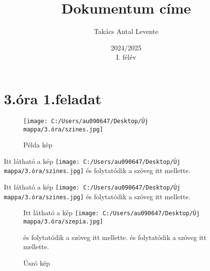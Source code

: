 \documentclass[12]{article}
\begin{document}
\listoffigures
{}

\listoftables

\title{Dokumentum címe} %
\author{Takács Antal Levente}
\date{2024/2025\\I. félév}

\maketitle





\newpage

\section{3.óra 1.feladat}

\begin{figure}[h]
    \centering
    \texttt{[image: C:/Users/au090647/Desktop/Új mappa/3.óra/szines.jpg]}
    \caption{Példa kép}
\end{figure}


\lipsum[1]


Itt látható a kép \texttt{[image: C:/Users/au090647/Desktop/Új mappa/3.óra/szines.jpg]} és folytatódik a szöveg itt mellette. \lipsum[2]


\lipsum[3]
\newpage

\lipsum[1]


Itt látható a kép \texttt{[image: C:/Users/au090647/Desktop/Új mappa/3.óra/szines.jpg]} és folytatódik a szöveg itt mellette. \lipsum[2]


\lipsum[3]


\begin{figure}[htbp]
    \centering
Itt látható a kép \texttt{[image: C:/Users/au090647/Desktop/Új mappa/3.óra/szepia.jpg]}
\caption{Úszó kép}  és folytatódik a szöveg itt mellette. és folytatódik a szöveg itt mellette. \lipsum[4]
\end{figure}
\end{document}
